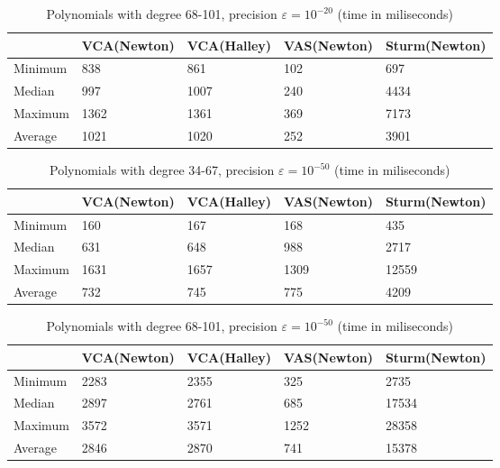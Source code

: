 \documentclass[
  digital, %
  notable,   %
  nolof,     %
  nolot,     %
	draft, %
]{fithesis3}
\begin{document}
\begin{table}
  \begin{tabular*}{\textwidth}{lllll}
    \toprule
     & VCA(Newton) & VCA(Halley) & VAS(Newton) & Sturm(Newton) \\
    \midrule
			Minimum & 838 & 861 & 102 & 697 \\
			Median & 997 & 1007 & 240 & 4434 \\
			Maximum & 1362 & 1361 & 369 & 7173 \\
			Average & 1021 & 1020 & 252 & 3901 \\
    \bottomrule
  \end{tabular*}
  \caption{Polynomials with degree 68-101, precision $\varepsilon = 10^{-20}$ (time in miliseconds)}
  \label{tab:coa2}
\end{table}

\begin{table}
  \begin{tabular*}{\textwidth}{lllll}
    \toprule
     & VCA(Newton) & VCA(Halley) & VAS(Newton) & Sturm(Newton) \\
    \midrule
			Minimum & 160 & 167 & 168 & 435 \\
			Median & 631 & 648 & 988 & 2717 \\
			Maximum & 1631 & 1657 & 1309 & 12559 \\
			Average & 732 & 745 & 775 & 4209 \\
    \bottomrule
  \end{tabular*}
  \caption{Polynomials with degree 34-67, precision $\varepsilon = 10^{-50}$ (time in miliseconds)}
  \label{tab:coa3}
\end{table}

\begin{table}
  \begin{tabular*}{\textwidth}{lllll}
    \toprule
     & VCA(Newton) & VCA(Halley) & VAS(Newton) & Sturm(Newton) \\
    \midrule
			Minimum & 2283 & 2355 & 325 & 2735 \\
			Median & 2897 & 2761 & 685 & 17534 \\
			Maximum & 3572 & 3571 & 1252 & 28358 \\
			Average & 2846 & 2870 & 741 & 15378 \\
    \bottomrule
  \end{tabular*}
  \caption{Polynomials with degree 68-101, precision $\varepsilon = 10^{-50}$ (time in miliseconds)}
  \label{tab:coa4}
\end{table}
\end{document}
